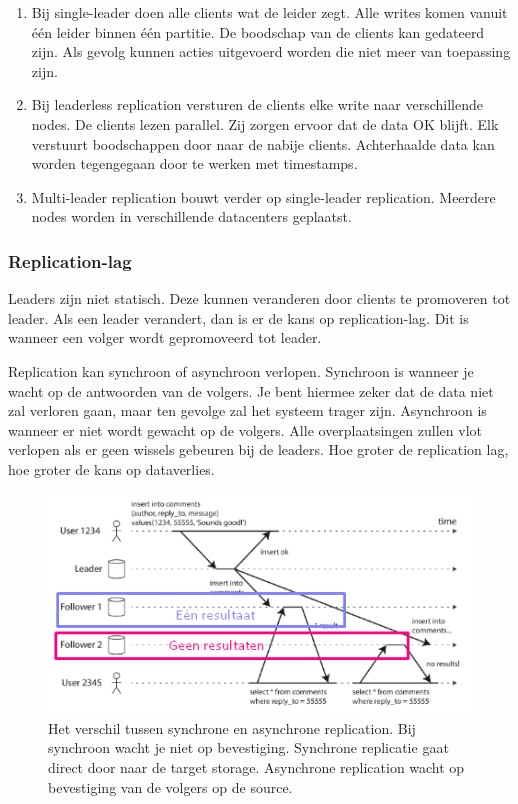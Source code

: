 \documentclass[a4paper,10pt,twoside]{report}
\begin{document}
\begin{enumerate}
	\item  Bij single-leader doen alle clients wat de leider zegt. Alle writes komen vanuit één leider binnen één partitie. De boodschap van de clients kan gedateerd zijn. Als gevolg kunnen acties uitgevoerd worden die niet meer van toepassing zijn. 
	\item Bij leaderless replication versturen de clients elke write naar verschillende nodes. De clients lezen parallel.  Zij zorgen ervoor dat de data OK blijft. Elk verstuurt boodschappen door naar de nabije clients. Achterhaalde data kan worden tegengegaan door te werken met timestamps.
	\item  Multi-leader replication bouwt verder op single-leader replication. Meerdere nodes worden in verschillende datacenters geplaatst.
\end{enumerate}

\subsubsection{Replication-lag}

Leaders zijn niet statisch. Deze kunnen veranderen door clients te promoveren tot leader. Als een leader verandert, dan is er de kans op replication-lag. Dit is wanneer een volger wordt gepromoveerd tot leader.

Replication kan synchroon of asynchroon verlopen. Synchroon is wanneer je wacht op de antwoorden van de volgers. Je bent hiermee zeker dat de data niet zal verloren gaan, maar ten gevolge zal het systeem trager zijn. Asynchroon is wanneer er niet wordt gewacht op de volgers. Alle overplaatsingen zullen vlot verlopen als er geen wissels gebeuren bij de leaders. Hoe groter de replication lag, hoe groter de kans op dataverlies.
 
\begin{figure}
 	\includegraphics[width=\linewidth]{../images/Screenshot_213.png}
 	\caption{Het verschil tussen synchrone en asynchrone replication. Bij synchroon wacht je niet op bevestiging. Synchrone replicatie gaat direct door naar de target storage. Asynchrone replication wacht op bevestiging van de volgers op de source.}
\end{figure}
\end{document}
